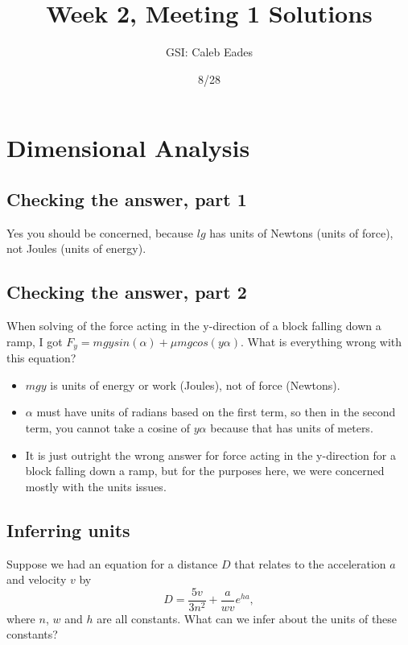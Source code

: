 \documentclass{article}
\begin{document}
	
\title{Week 2, Meeting 1 Solutions}
\author{GSI: Caleb Eades}
\date{8/28}
\maketitle

\section{Dimensional Analysis}

\subsection{Checking the answer, part 1}

Yes you should be concerned, because $lg$ has units of Newtons (units of force), not Joules (units of energy).

\subsection{Checking the answer, part 2}

When solving of the force acting in the y-direction of a block falling down a ramp, I got $F_y=mgysin(\alpha) + \mu mgcos(y\alpha)$. What is everything wrong with this equation?

\begin{itemize}
	\item $mgy$ is units of energy or work (Joules), not of force (Newtons).
	\item $\alpha$ must have units of radians based on the first term, so then in the second term, you cannot take a cosine of $y\alpha$ because that has units of meters.
	\item It is just outright the wrong answer for force acting in the y-direction for a block falling down a ramp, but for the purposes here, we were concerned mostly with the units issues.
\end{itemize}

\subsection{Inferring units}

Suppose we had an equation for a distance $D$ that relates to the acceleration $a$ and velocity $v$ by
\begin{equation}
D = \frac{5v}{3n^2} + \frac{a}{wv}e^{ha},
\end{equation}
where $n$, $w$ and $h$ are all constants. What can we infer about the units of these constants?
\end{document}
